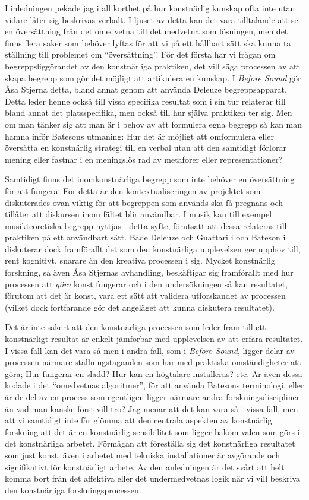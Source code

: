 \documentclass[11pt]{article}
\begin{document}
I inledningen pekade jag i all korthet på hur konstnärlig kunskap ofta
inte utan vidare låter sig beskrivas verbalt. I ljuset av detta kan
det vara tilltalande att se en översättning från det omedvetna till
det medvetna som lösningen, men det finns flera saker som behöver
lyftas för att vi på ett hållbart sätt ska kunna ta ställning till
problemet om ``översättning''. För det första har vi frågan om
begreppsliggörandet av den konstnärliga praktiken, det vill säga
processen av att skapa begrepp som gör det möjligt att artikulera en
kunskap. I \emph{Before Sound} gör Åsa Stjerna detta, bland annat
genom att använda Deleuze begreppsapparat. Detta leder henne också
till vissa specifika resultat som i sin tur relaterar till bland annat det
platsspecifika, men också till hur själva praktiken ter sig. Men om
man tänker sig att man är i behov av att formulera egna begrepp så kan
man hamna inför Batesons utmaning: Hur det är möjligt att
omformulera eller översätta en konstnärlig strategi till en verbal
utan att den samtidigt förlorar mening eller fastnar i en meningslös
rad av metaforer eller representationer?

Samtidigt finns det inomkonstnärliga begrepp som inte behöver en
översättning för att fungera. För detta är den kontextualiseringen av
projektet som diskuterades ovan viktig för att begreppen som används
ska få pregnans och tillåter att diskursen inom fältet blir
användbar. I musik kan till exempel musikteoretiska begrepp nyttjas i
detta syfte, förutsatt att dessa relateras till praktiken på ett
användbart sätt. Både Deleuze och Guattari i 
och Bateson i  diskuterar dock framförallt det
som den konstnärliga upplevelsen ger upphov till, rent kognitivt,
snarare än den kreativa processen i sig. Mycket konstnärlig forskning,
så även Åsa Stjernas avhandling, beskäftigar sig framförallt med hur
processen att \emph{göra} konst fungerar och i den undersökningen så
kan resultatet, förutom att det är konst, vara ett sätt att validera
utforskandet av processen (vilket dock fortfarande gör det
angeläget att kunna diskutera resultatet).

Det är inte säkert att den konstnärliga processen som leder fram till
ett konstnärligt resultat är enkelt jämförbar med upplevelsen av att
erfara resultatet. I vissa fall kan det vara så men i andra fall, som
i \emph{Before Sound}, ligger delar av processen närmare
ställningstaganden som har med praktiska omständigheter att göra; Hur
fungerar en sladd? Hur kan en högtalare installeras? etc. Är även
dessa kodade i det ``omedvetnas algoritmer'', för att använda Batesons
terminologi, eller är de del av en process som egentligen ligger
närmare andra forskningsdiscipliner än vad man kanske först vill tro?
Jag menar att det kan vara så i vissa fall, men att vi samtidigt inte
får glömma att den centrala aspekten av konstnärlig forskning att det
är en konstnärlig sensibilitet som ligger bakom valen som görs i det
konstnärliga arbetet. Förmågan att föreställa sig det konstnärliga
resultatet som just konst, även i arbetet med tekniska installationer
är avgörande och signifikativt för konstnärligt arbete. Av den
anledningen är det svårt att helt komma bort från det affektiva eller
det undermedvetnas logik när vi vill beskriva den konstnärliga
forskningsprocessen.
\end{document}
